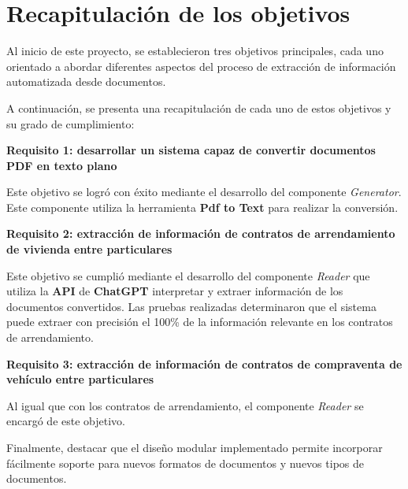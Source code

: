 \section{Recapitulación de los objetivos}

Al inicio de este proyecto, se establecieron tres objetivos principales, cada uno orientado a abordar diferentes
aspectos del proceso de extracción de información automatizada desde documentos.

A continuación, se presenta una recapitulación de cada uno de estos objetivos y su grado de cumplimiento:

\textbf{Requisito 1: desarrollar un sistema capaz de convertir documentos PDF en texto plano}

Este objetivo se logró con éxito mediante el desarrollo del componente \textit{Generator}.
Este componente utiliza la herramienta \textbf{Pdf to Text} para realizar la conversión.

\textbf{Requisito 2: extracción de información de contratos de arrendamiento de vivienda entre particulares}

Este objetivo se cumplió mediante el desarrollo del componente \textit{Reader} que utiliza la \textbf{API}
de \textbf{ChatGPT} interpretar y extraer información de los documentos convertidos.
Las pruebas realizadas determinaron que el sistema puede extraer con precisión el 100\% de la información relevante
en los contratos de arrendamiento.

\textbf{Requisito 3: extracción de información de contratos de compraventa de vehículo entre particulares}

Al igual que con los contratos de arrendamiento, el componente \textit{Reader} se encargó de este objetivo.

Finalmente, destacar que el diseño modular implementado permite incorporar fácilmente soporte para nuevos formatos de
documentos y nuevos tipos de documentos.